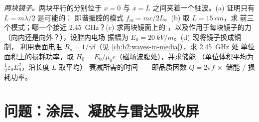 \begin{exercise}[$\star\star\star$]\label{exo:b2:wave-interfaces:12}
\emph{两块镜子。}两块平行的分别位于 $x = 0$ 与 $x =
L$ 之间夹着一个驻波。(a) 证明只有 $L = m\lambda/2$ 是可能的：
即谐振腔的模式 $f_m = mc/2L$。(b) 取 $L = \qty{15}{cm}$，求
前三个模式；哪一个接近 \qty{2.45}{GHz}？(c) 求两块镜面上的
，以及作用于每块镜子的力（向内还是向外？），设腔内电场
振幅为 $E_0 = \qty{20}{kV/m}$。(d) 现将镜子换成铜制，
利用表面电阻 $R_s = 1/\gamma\delta$（见
\cref{ch:b2:waves-in-media}），求 \qty{2.45}{GHz} 处
单位面积上的损耗功率，取 $H_0 = E_0/\mu_0c$（磁场波腹处），并求储能
（单位体积平均为 $\tfrac12\varepsilon_0E_0^2$，沿长度 $L$ 取平均）
衰减所需的时间——即品质因数 $Q = 2\pi f\,\times$ 储能 / 损耗功率。
\end{exercise}

\section{问题：涂层、凝胶与雷达吸收屏}

